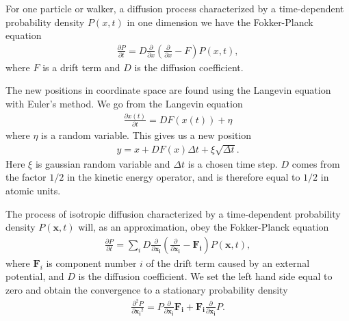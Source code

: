 \documentclass[x11names]{article}
\begin{document}
		For one particle or walker, a diffusion process characterized by a
		time-dependent probability density $P\left(x,t\right)$ in one dimension
		we have the Fokker-Planck equation
		\begin{align}
			\frac{\partial P}{\partial t}=D\frac{\partial}{\partial x}\left(\frac{\partial}{\partial x}-F\right)P\left(x,t\right),
		\end{align}
		where $F$ is a drift term and $D$ is the diffusion coefficient.

		The new positions in coordinate space are found using the Langevin
		equation with Euler's method. We go from the Langevin equation
		\begin{align}
			\frac{\partial x(t)}{\partial t}=DF(x(t))+\eta
		\end{align}
		where $\eta$ is a random variable. This gives us a new position
		\begin{align}
			y=x+DF(x)\Delta t+\xi\sqrt{\Delta t}.
		\end{align}
		Here $\xi$ is gaussian random variable and $\Delta t$ is a chosen
		time step. $D$ comes from the factor $1/2$ in the kinetic energy
		operator, and is therefore equal to $1/2$ in atomic units.

		The process of isotropic diffusion characterized by a time-dependent
		probability density $P\left(\mathbf{x},t\right)$ will, as an approximation,
		obey the Fokker-Planck equation
		\begin{align}
			\frac{\partial P}{\partial t}=\sum_{i}D\frac{\partial}{\partial\mathbf{x_{i}}}\left(\frac{\partial}{\partial\mathbf{x_{i}}}-\mathbf{F_{i}}\right)P(\mathbf{x},t),
		\end{align}
		where $\mathbf{F}_{i}$ is component number $i$ of the drift term
		caused by an external potential, and $D$ is the diffusion coefficient.
		We set the left hand side equal to zero and obtain the convergence
		to a stationary probability density
		\begin{align}
			\frac{\partial^{2}P}{\partial{\mathbf{x_{i}}^{2}}}=P\frac{\partial}{\partial{\mathbf{x_{i}}}}\mathbf{F_{i}}+\mathbf{F_{i}}\frac{\partial}{\partial{\mathbf{x_{i}}}}P.
		\end{align}
\end{document}
